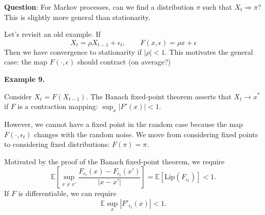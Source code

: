 \textbf{Question}: For Markov processes, can we find a distribution \(\pi\) such that \(X_t \Rightarrow \pi\)? This is slightly more general than stationarity.

Let's revisit an old example. If
\[X_t = \rho X_{t-1} + \epsilon_t, \qquad F(x, \epsilon) = \rho x + \epsilon\]
Then we have convergence to stationarity if \(|\rho| < 1\). This motivates the general case: the map \(F(\cdot, \epsilon)\) should contract (on average?)

\textbf{Example 9.}

Consider \(X_t = F(X_{t-1})\). The Banach fixed-point theorem asserts that \(X_t \to x^*\) if \(F\) is a contraction mapping: \(\sup_x |F'(x)| < 1\).

However, we cannot have a fixed point in the random case because the map \(F(\cdot, \epsilon_t)\) changes with the random noise. We move from considering fixed points to considering fixed distributions: \(F(\pi) = \pi\).

Motivated by the proof of the Banach fixed-point theorem, we require
\[\mathbb{E} \left[\sup_{x \neq x'} \frac{F_{\epsilon_t}(x) - F_{\epsilon_t}(x')}{|x - x'|}\right] = \mathbb{E}[\text{Lip}(F_{\epsilon_t})] < 1.\]
If \(F\) is differentiable, we can require
\[\mathbb{E} \sup_x |F'_{\epsilon_t}(x)| < 1.\]
